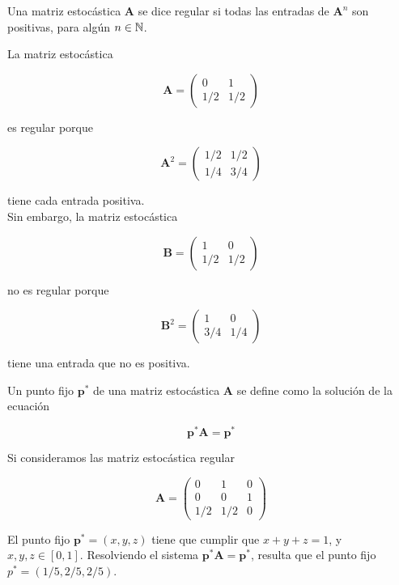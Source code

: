 \begin{defi}
Una matriz estocástica $\mathbf{A}$ se dice regular si todas las entradas de $\mathbf{A}^n$ son positivas, para algún $n \in \mathbb{N}$.
\end{defi}

\begin{ejemplo}
La matriz estocástica

\[ \mathbf{A} = \left(\begin{array}{cc}
0 & 1\\
1/2 & 1/2
\end{array}\right) \]

es regular porque 

\[ \mathbf{A}^2 = \left(\begin{array}{cc}
1/2 & 1/2\\
1/4 & 3/4
\end{array}\right) \]

tiene cada entrada positiva.\\
Sin embargo, la matriz estocástica

\[ \mathbf{B} = \left(\begin{array}{cc}
1 & 0\\
1/2 & 1/2
\end{array}\right) \]

no es regular porque

\[ \mathbf{B}^2 = \left(\begin{array}{cc}
1 & 0\\
3/4 & 1/4
\end{array}\right) \]

tiene una entrada que no es positiva.
\end{ejemplo}

\begin{defi}
Un punto fijo $\mathbf{p}^*$ de una matriz estocástica $\mathbf{A}$ se define como la solución de la ecuación

\[ \mathbf{p}^* \mathbf{A} = \mathbf{p}^* \]
\end{defi}

\begin{ejemplo}
Si consideramos las matriz estocástica regular

\[ \mathbf{A} = \left(\begin{array}{ccc}
0 & 1 & 0\\
0 & 0 & 1\\
1/2 & 1/2 & 0
\end{array}\right) \]

El punto fijo $\mathbf{p}^* = (x,y,z)$ tiene que cumplir que $x+y+z = 1$, y $x,y,z \in [0,1]$. Resolviendo el sistema $\mathbf{p}^* \mathbf{A} = \mathbf{p}^*$, resulta que el punto fijo $p^* = (1/5, 2/5, 2/5)$.
\end{ejemplo}


